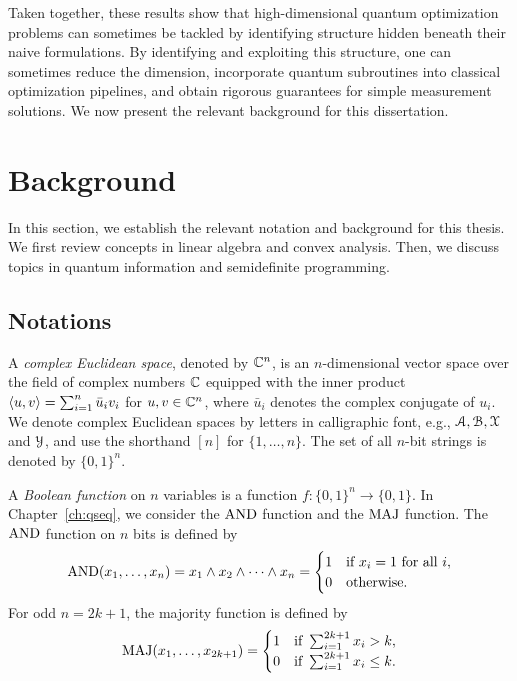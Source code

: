 

Taken together, these results show that high-dimensional quantum optimization problems can sometimes be tackled by identifying structure hidden beneath their naive formulations. 
By identifying and exploiting this structure, one can sometimes reduce the dimension, incorporate quantum subroutines into classical optimization pipelines, and obtain rigorous guarantees for simple measurement solutions. 
We now present the relevant background for this dissertation.

\section{Background}

In this section, we establish the relevant notation and background for this thesis.
We first review concepts in linear algebra and convex analysis.
Then, we discuss topics in quantum information and semidefinite programming.

\subsection{Notations}

A \emph{complex Euclidean space}, denoted by $\mathbb{C}^n$, is an $n$-dimensional vector space over the field of complex numbers $\mathbb{C}$ equipped with the inner product $\left\langle u, v \right\rangle = \sum_{i=1}^n \bar{u}_i v_i$ for $u, v \in \mathbb{C}^n$, where $\bar{u}_i$ denotes the complex conjugate of $u_i$.
We denote complex Euclidean spaces by letters in calligraphic font, e.g., $\mathcal{A}, \mathcal{B}, \mathcal{X}$ and $\mathcal{Y}$, and use the shorthand $[n]$ for $\{ 1, \ldots, n \}$.
The set of all $n$-bit strings is denoted by $\{0,1\}^n$.

A \emph{Boolean function} on $n$ variables is a function $f: \{0,1\}^n \to \{0,1\}$.
In Chapter~\ref{ch:qseq}, we consider the $\mathrm{AND}$ function and the $\mathrm{MAJ}$ function. 
The $\mathrm{AND}$ function on $n$ bits is defined by
\begin{equation}
    \mathrm{AND}(x_1,\ldots,x_n) = x_1 \wedge x_2 \wedge \cdots \wedge x_n = \begin{cases}
        1 & \text{if } x_i = 1 \text{ for all } i, \\
        0 & \text{otherwise}.
    \end{cases}
\end{equation}
For odd $n = 2k+1$, the majority function is defined by
\begin{equation}
    \mathrm{MAJ}(x_1,\ldots,x_{2k+1}) = \begin{cases}
        1 & \text{if } \sum_{i=1}^{2k+1} x_i > k, \\
        0 & \text{if } \sum_{i=1}^{2k+1} x_i \leq k.
    \end{cases}
\end{equation}

